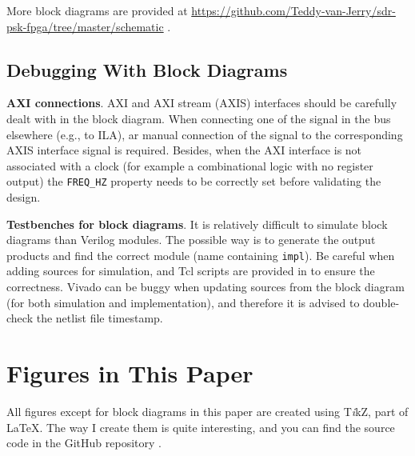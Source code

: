 \documentclass[journal,twoside]{IEEEtran}
\begin{document}
    More block diagrams are provided at \url{https://github.com/Teddy-van-Jerry/sdr-psk-fpga/tree/master/schematic} \cite{github_repo}.

    \subsection{Debugging With Block Diagrams}

      \textbf{AXI connections}.
      AXI and AXI stream (AXIS) interfaces should be carefully dealt with in the block diagram.
      When connecting one of the signal in the bus elsewhere (e.g., to ILA),
      ar manual connection of the signal to the corresponding AXIS interface signal is required.
      Besides, when the AXI interface is not associated with a clock (for example a combinational logic with no register output)
      the \texttt{FREQ\_HZ} property needs to be correctly set before validating the design.

      \textbf{Testbenches for block diagrams}.
      It is relatively difficult to simulate block diagrams than Verilog modules.
      The possible way is to generate the output products and find the correct module (name containing \texttt{impl}).
      Be careful when adding sources for simulation, and Tcl scripts are provided in \cite{github_repo} to ensure the correctness.
      Vivado can be buggy when updating sources from the block diagram (for both simulation and implementation),
      and therefore it is advised to double-check the netlist file timestamp.


  \section{Figures in This Paper}

    All figures except for block diagrams in this paper
    are created using T\textit{i}kZ, part of \LaTeX{}.
    The way I create them is quite interesting,
    and you can find the source code in the GitHub repository \cite{github_repo}.

  
  
\end{document}
